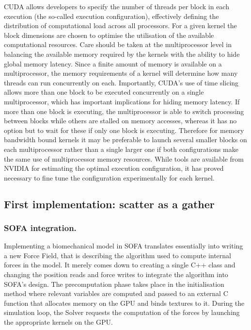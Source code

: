 CUDA allows developers to specify the number of threads per block in each execution (the so-called execution configuration), effectively defining the distribution of computational load across all processors. For a given kernel the block dimensions are chosen to optimise the utilisation of the available computational resources. Care should be taken at the multiprocessor level in balancing the available memory required by the kernels with the ability to hide global memory latency. Since a finite amount of memory is available on a multiprocessor, the memory requirements of a kernel will determine how many threads can run concurrently on each. Importantly, CUDA's use of time slicing allows more than one block to be executed concurrently on a single multiprocessor, which has important implications for hiding memory latency. If more than one block is executing, the multiprocessor is able to switch processing between blocks while others are stalled on memory accesses, whereas it has no option but to wait for these if only one block is executing. Therefore for memory bandwidth bound kernels it may be preferable to launch several smaller blocks on each multiprocessor rather than a single larger one if both configurations make the same use of multiprocessor memory resources. While tools are available from NVIDIA for estimating the optimal execution configuration, it has proved necessary to fine tune the configuration experimentally for each kernel.


	\subsection{First implementation: scatter as a gather}
	
\subsubsection*{SOFA integration.}
Implementing a biomechanical model in SOFA translates essentially into writing a new Force Field, that is describing the algorithm used to compute internal forces in the model. It merely comes down to creating a single C++ class and changing the position reads and force writes to integrate the algorithm into SOFA's design. The precomputation phase takes place in the initialisation method where relevant variables are computed and passed to an external C function that allocates memory on the GPU and binds textures to it. During the simulation loop, the Solver requests the computation of the forces by launching the appropriate kernels on the GPU.

